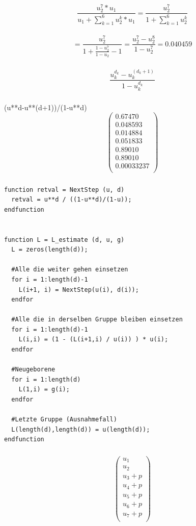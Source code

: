 \documentclass{article}
\begin{document}
\subsubsection{}
\Large {
$$\frac{u_2^7 * u_1}{u_1 + \sum_{k=1}^{6} u_2^k * u_1} 
= \frac{u_2^7}{1 + \sum_{k=1}^{6} u_2^k}$$ \\
$$= \frac{u_2^7}{1 + \frac{1 - u_2^7}{1 - u_2}-1} =
 \frac{u_2^7 - u_2^8}{1-u_2^7} = 0.040459$$
}

\subsubsection{}
\Large {
$$\frac{u_k^{d_k} - u_k^{(d_k+1)}}{1-u_k^{d_k}}$$
}

\subsubsection{}
(u**d-u**(d+1))/(1-u**d)
\[
    \begin{pmatrix}
     0.67470 \\
     0.048593 \\
     0.014884  \\
     0.051833 \\
     0.89010 \\
     0.89010 \\
     0.00033237 \\
    \end{pmatrix}
\]

\subsubsection{}
\normalsize
\begin{lstlisting}
function retval = NextStep (u, d)
  retval = u**d / ((1-u**d)/(1-u));
endfunction


function L = L_estimate (d, u, g)
  L = zeros(length(d));
  
  #Alle die weiter gehen einsetzen
  for i = 1:length(d)-1
    L(i+1, i) = NextStep(u(i), d(i));
  endfor
  
  #Alle die in derselben Gruppe bleiben einsetzen
  for i = 1:length(d)-1
    L(i,i) = (1 - (L(i+1,i) / u(i)) ) * u(i);
  endfor
  
  #Neugeborene
  for i = 1:length(d)
    L(1,i) = g(i);
  endfor
  
  #Letzte Gruppe (Ausnahmefall)
  L(length(d),length(d)) = u(length(d));
endfunction
\end{lstlisting}

\subsubsection{}
\Large
\[
    \begin{pmatrix}
     u_1 \\
     u_2 \\
     u_3 + p  \\
     u_4 + p \\
     u_5 + p \\
     u_6 + p \\
     u_7 + p \\
    \end{pmatrix}
\]
\end{document}
